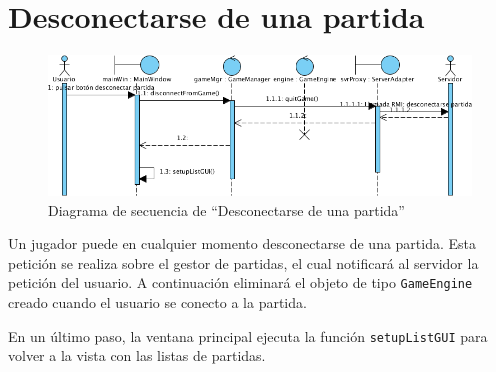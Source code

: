 \section{Desconectarse de una partida}

\begin{figure}[ht]
\centering
\includegraphics[scale=0.6]{img/ch03devel-exitgame.png}
\caption{Diagrama de secuencia de ``Desconectarse de una partida''}
\end{figure}

Un jugador puede en cualquier momento desconectarse de una partida. Esta
petición se realiza sobre el gestor de partidas, el cual notificará al servidor
la petición del usuario. A continuación eliminará el objeto de tipo
\texttt{GameEngine} creado cuando el usuario se conecto a la partida.

En un último paso, la ventana principal ejecuta la función
\texttt{setupListGUI} para volver a la vista con las listas de partidas.
